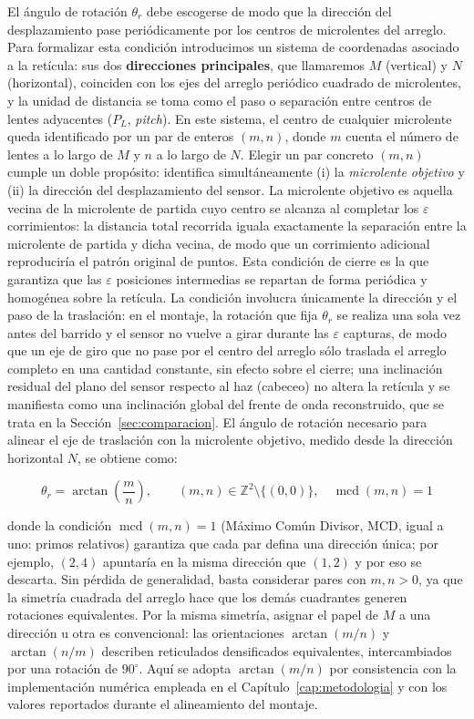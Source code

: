 \documentclass[letterpaper,12pt,oneside]{book}
\DeclareMathOperator{\mcd}{mcd} %
\begin{document}
El ángulo de rotación $\theta_r$ debe escogerse de modo que la dirección del
desplazamiento pase periódicamente por los centros de microlentes del arreglo. Para
formalizar esta condición introducimos un sistema de coordenadas asociado a la retícula:
sus dos \textbf{direcciones principales}, que llamaremos $M$ (vertical) y $N$
(horizontal), coinciden con los ejes del arreglo periódico cuadrado de microlentes, y la
unidad de distancia se toma como el paso o separación entre centros de lentes adyacentes
($P_L$, \textit{pitch}). En este sistema, el centro de cualquier microlente queda
identificado por un par de enteros $(m,n)$, donde $m$ cuenta el número de lentes a lo
largo de $M$ y $n$ a lo largo de $N$. Elegir un par concreto $(m,n)$ cumple un doble
propósito: identifica simultáneamente (i) la \emph{microlente objetivo} y (ii) la
dirección del desplazamiento del sensor. La microlente objetivo es aquella vecina de la
microlente de partida cuyo centro se alcanza al completar los $\varepsilon$ corrimientos:
la distancia total recorrida iguala exactamente la separación entre la microlente de
partida y dicha vecina, de modo que un corrimiento adicional reproduciría el patrón
original de puntos. Esta condición de cierre es la que garantiza que las $\varepsilon$
posiciones intermedias se repartan de forma periódica y homogénea sobre la retícula. La
condición involucra únicamente la dirección y el paso de la traslación: en el montaje, la
rotación que fija $\theta_r$ se realiza una sola vez antes del barrido y el sensor no
vuelve a girar durante las $\varepsilon$ capturas, de modo que un eje de giro que no pase
por el centro del arreglo sólo traslada el arreglo completo en una cantidad constante, sin
efecto sobre el cierre; una inclinación residual del plano del sensor respecto al haz
(cabeceo) no altera la retícula y se manifiesta como una inclinación global del frente de
onda reconstruido, que se trata en la Sección~\ref{sec:comparacion}. El ángulo de rotación
necesario para alinear el eje de traslación con la microlente objetivo, medido desde la
dirección horizontal $N$, se obtiene como:

\begin{equation}
\theta_r = \arctan\!\left(\frac{m}{n}\right), \qquad (m,n) \in \mathbb{Z}^2 \setminus \{(0,0)\}, \quad \mcd(m,n) = 1
\label{Eq: angulo}
\end{equation}

donde la condición $\mcd(m,n)=1$ (Máximo Común Divisor, MCD, igual a uno: primos
relativos) garantiza que cada par defina una dirección única; por ejemplo, $(2,4)$
apuntaría en la misma dirección que $(1,2)$ y por eso se descarta. Sin pérdida de
generalidad, basta considerar pares con $m, n > 0$, ya que la simetría cuadrada del
arreglo hace que los demás cuadrantes generen rotaciones equivalentes. Por la misma
simetría, asignar el papel de $M$ a una dirección u otra es convencional: las
orientaciones $\arctan(m/n)$ y $\arctan(n/m)$ describen reticulados densificados
equivalentes, intercambiados por una rotación de $90^\circ$. Aquí se adopta $\arctan(m/n)$
por consistencia con la implementación numérica empleada en el
Capítulo~\ref{cap:metodologia} y con los valores reportados durante el alineamiento del
montaje.
\end{document}

